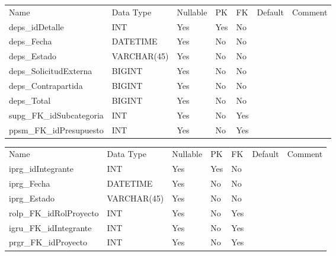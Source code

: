 			\begin{center}
				\begin{tabular}{ |l|l|l|l|l|l|l| }
					\hline
					Name & Data Type & Nullable & PK & FK & Default & Comment \\
					deps_idDetalle & INT & Yes & Yes & No &  & \\ \hline 
deps_Fecha & DATETIME & Yes & No & No &  & \\ \hline 
deps_Estado & VARCHAR(45) & Yes & No & No &  & \\ \hline 
deps_SolicitudExterna & BIGINT & Yes & No & No &  & \\ \hline 
deps_Contrapartida & BIGINT & Yes & No & No &  & \\ \hline 
deps_Total & BIGINT & Yes & No & No &  & \\ \hline 
supg_FK_idSubcategoria & INT & Yes & No & Yes &  & \\ \hline 
ppsm_FK_idPresupuesto & INT & Yes & No & Yes &  & \\ \hline 

				\end{tabular}
			\end{center}
		

			\begin{center}
				\begin{tabular}{ |l|l|l|l|l|l|l| }
					\hline
					Name & Data Type & Nullable & PK & FK & Default & Comment \\
					iprg_idIntegrante & INT & Yes & Yes & No &  & \\ \hline 
iprg_Fecha & DATETIME & Yes & No & No &  & \\ \hline 
iprg_Estado & VARCHAR(45) & Yes & No & No &  & \\ \hline 
rolp_FK_idRolProyecto & INT & Yes & No & Yes &  & \\ \hline 
igru_FK_idIntegrante & INT & Yes & No & Yes &  & \\ \hline 
prgr_FK_idProyecto & INT & Yes & No & Yes &  & \\ \hline 

				\end{tabular}
			\end{center}
		